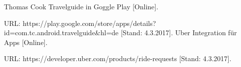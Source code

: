 \begin{thebibliography}{9}
Thomas Cook Travelguide in Goggle Play [Online].

URL: https://play.google.com/store/apps/details?id=com.tc.android.travelguide\&hl=de [Stand: 4.3.2017].
Uber Integration für Apps [Online].

URL: https://developer.uber.com/products/ride-requests [Stand: 4.3.2017].
\end{thebibliography}
